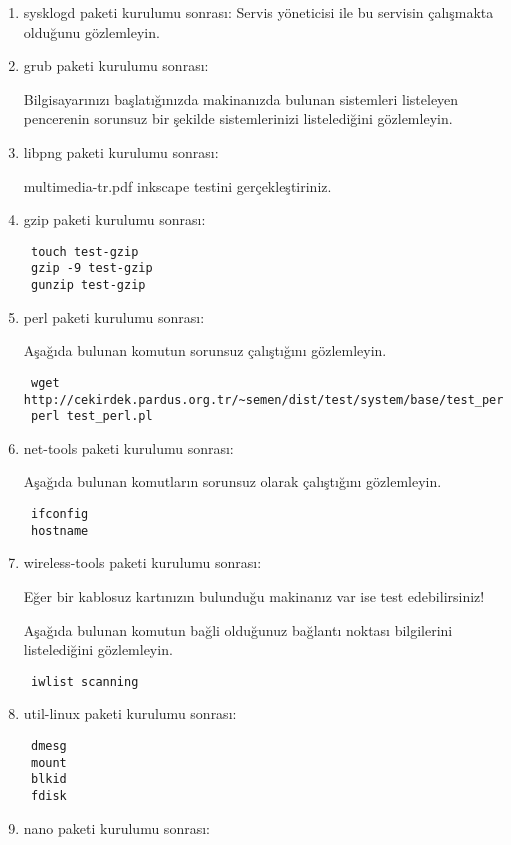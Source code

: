 \documentclass[a4paper,10pt]{article}
\begin{document}
\begin{enumerate}
\item sysklogd paketi kurulumu sonrası:
Servis yöneticisi ile bu servisin çalışmakta olduğunu gözlemleyin.

\item grub paketi kurulumu sonrası:

Bilgisayarınızı başlatığınızda makinanızda bulunan sistemleri listeleyen pencerenin sorunsuz bir şekilde sistemlerinizi listelediğini gözlemleyin. 

\item libpng paketi kurulumu sonrası:

multimedia-tr.pdf inkscape testini gerçekleştiriniz.

\item gzip paketi kurulumu sonrası:
\begin{verbatim}
 touch test-gzip
 gzip -9 test-gzip
 gunzip test-gzip 
\end{verbatim}


\item perl paketi kurulumu sonrası:

Aşağıda bulunan komutun sorunsuz çalıştığını gözlemleyin.
\begin{verbatim}
 wget http://cekirdek.pardus.org.tr/~semen/dist/test/system/base/test_perl.pl
 perl test_perl.pl
\end{verbatim}

\item net-tools paketi kurulumu sonrası:

Aşağıda bulunan komutların sorunsuz olarak çalıştığını gözlemleyin.
\begin{verbatim}
 ifconfig
 hostname
\end{verbatim}


\item wireless-tools paketi kurulumu sonrası:

Eğer bir kablosuz kartınızın bulunduğu makinanız var ise test edebilirsiniz!

Aşağıda bulunan komutun bağli olduğunuz bağlantı noktası bilgilerini listelediğini gözlemleyin.
\begin{verbatim}
 iwlist scanning
\end{verbatim}


\item util-linux paketi kurulumu sonrası:
\begin{verbatim}
 dmesg
 mount 
 blkid
 fdisk
\end{verbatim}

\item nano paketi kurulumu sonrası:


\end{enumerate}
\end{document}
